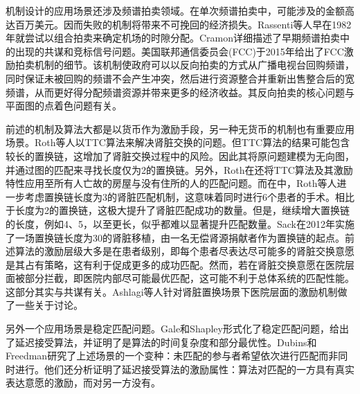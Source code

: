 \documentclass[promaster]{thesis-uestc}
\begin{document}
机制设计的应用场景还涉及频谱拍卖领域。在单次频谱拍卖中，可能涉及的金额高达百万美元。因而失败的机制将带来不可挽回的经济损失。Rassenti等人早在1982年就尝试以组合拍卖来确定机场的时隙分配。Cramon详细描述了早期频谱拍卖中的出现的共谋和竞标信号问题。美国联邦通信委员会(FCC)于2015年给出了FCC激励拍卖机制的细节。该机制使政府可以以反向拍卖的方式从广播电视台回购频谱，同时保证未被回购的频谱不会产生冲突，然后进行资源整合并重新出售整合后的宽频谱，从而更好得分配频谱资源并带来更多的经济收益。其反向拍卖的核心问题与平面图的点着色问题有关。

前述的机制及算法大都是以货币作为激励手段，另一种无货币的机制也有重要应用场景。Roth等人以TTC算法来解决肾脏交换的问题。但TTC算法的结果可能包含较长的置换链，这增加了肾脏交换过程中的风险。因此其将原问题建模为无向图，并通过图的匹配来寻找长度仅为2的置换链\cite{roth2005pairwise}。另外，Roth在\cite{roth2004kidney}还将TTC算法及其激励特性应用至所有人亡故的房屋与没有住所的人的匹配问题。而在\cite{roth2007efficient}中，Roth等人进一步考虑置换链长度为3的肾脏匹配机制，这意味着同时进行6个患者的手术。相比于长度为2的置换链，这极大提升了肾脏匹配成功的数量。但是，继续增大置换链的长度，例如4、5，以至更长，似乎都难以显著提升匹配数量。Sack在2012年实施了一场置换链长度为30的肾脏移植，由一名无偿肾源捐献者作为置换链的起点。前述算法的激励层级大多是在患者级别，即每个患者尽表达尽可能多的肾脏交换意愿是其占有策略，这有利于促成更多的成功匹配。然而，若在肾脏交换意愿在医院层面被部分拦截，即医院内部尽可能最优匹配，这可能不利于总体系统的匹配性能。这部分其实与共谋有关。Ashlagi等人针对肾脏置换场景下医院层面的激励机制做了一些关于讨论。

另外一个应用场景是稳定匹配问题。Gale和Shapley形式化了稳定匹配问题，给出了延迟接受算法，并证明了是算法的时间复杂度和部分最优性。Dubins和Freedman研究了上述场景的一个变种：未匹配的参与者希望依次进行匹配而非同时进行。他们还分析证明了延迟接受算法的激励属性：算法对匹配的一方具有真实表达意愿的激励，而对另一方没有。
\end{document}
